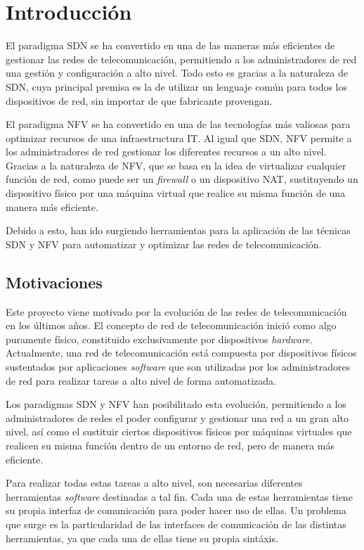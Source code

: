 \chapter{Introducción}

El paradigma \ac{SDN} se ha convertido en una de las maneras más eficientes de gestionar las redes de telecomunicación, permitiendo a los administradores de red una gestión y configuración a alto nivel. Todo esto es gracias a la naturaleza de SDN, cuya principal premisa es la de utilizar un lenguaje común para todos los dispositivos de red, sin importar de que fabricante provengan.

El paradigma \ac{NFV} se ha convertido en una de las tecnologías más valiosas para optimizar recursos de una infraestructura IT. Al igual que \ac{SDN}, \ac{NFV} permite a los administradores de red gestionar los diferentes recursos a un alto nivel. Gracias a la naturaleza de NFV, que se basa en la idea de virtualizar cualquier función de red, como puede ser un \textit{firewall} o un dispositivo \ac{NAT}, sustituyendo un dispositivo físico por una máquina virtual que realice su misma función de una manera más eficiente.

Debido a esto, han ido surgiendo herramientas para la aplicación de las técnicas \ac{SDN} y \ac{NFV} para automatizar y optimizar las redes de telecomunicación.

\section{Motivaciones}

Este proyecto viene motivado por la evolución de las redes de telecomunicación en los últimos años. El concepto de red de telecomunicación inició como algo puramente físico, constituido exclusivamente por dispositivos \textit{hardware}. Actualmente, una red de telecomunicación está compuesta por dispositivos físicos sustentados por aplicaciones \textit{software} que son utilizadas por los administradores de red para realizar tareas a alto nivel de forma automatizada.

Los paradigmas \ac{SDN} y \ac{NFV} han posibilitado esta evolución, permitiendo a los administradores de redes el poder configurar y gestionar una red a un gran alto nivel, así como el sustituir ciertos dispositivos físicos por máquinas virtuales que realicen su misma función dentro de un entorno de red, pero de manera más eficiente.

Para realizar todas estas tareas a alto nivel, son necesarias diferentes herramientas \textit{software} destinadas a tal fin. Cada una de estas herramientas tiene su propia interfaz de comunicación para poder hacer uso de ellas. Un problema que surge es la particularidad de las interfaces de comunicación de las distintas herramientas, ya que cada una de ellas tiene su propia sintáxis.

